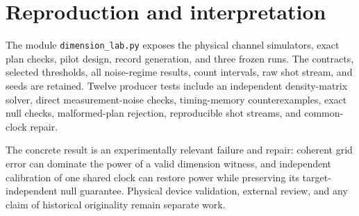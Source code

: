 \section{Reproduction and interpretation}
The module \texttt{dimension\_lab.py} exposes the physical channel simulators,
exact plan checks, pilot design, record generation, and three frozen runs.
The contracts, selected thresholds, all noise-regime results, count intervals,
raw shot stream, and seeds are retained. Twelve producer tests include an
independent density-matrix solver, direct measurement-noise checks, timing-memory
counterexamples, exact null checks, malformed-plan rejection, reproducible shot
streams, and common-clock repair.

The concrete result is an experimentally relevant failure and repair:
coherent grid error can dominate the power of a valid dimension witness,
and independent calibration of one shared clock can restore power while
preserving its target-independent null guarantee. Physical device validation,
external review, and any claim of historical originality remain separate work.
